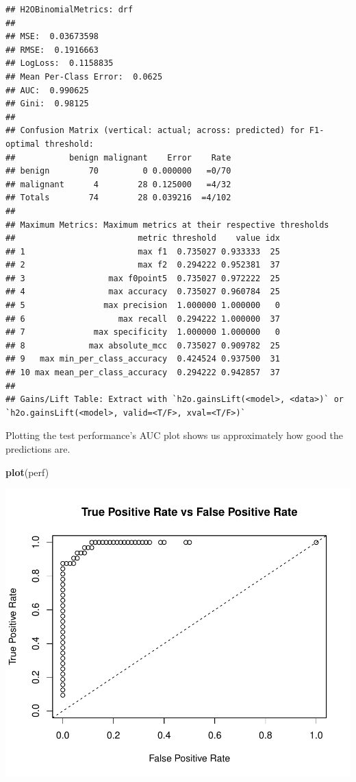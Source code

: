 \documentclass[]{article}
\newenvironment{Shaded}{\begin{snugshade}}{\end{snugshade}}
\newcommand{\KeywordTok}[1]{\textcolor[rgb]{0.13,0.29,0.53}{\textbf{{#1}}}}
\newcommand{\NormalTok}[1]{{#1}}
\begin{document}
\begin{verbatim}
## H2OBinomialMetrics: drf
## 
## MSE:  0.03673598
## RMSE:  0.1916663
## LogLoss:  0.1158835
## Mean Per-Class Error:  0.0625
## AUC:  0.990625
## Gini:  0.98125
## 
## Confusion Matrix (vertical: actual; across: predicted) for F1-optimal threshold:
##           benign malignant    Error    Rate
## benign        70         0 0.000000   =0/70
## malignant      4        28 0.125000   =4/32
## Totals        74        28 0.039216  =4/102
## 
## Maximum Metrics: Maximum metrics at their respective thresholds
##                         metric threshold    value idx
## 1                       max f1  0.735027 0.933333  25
## 2                       max f2  0.294222 0.952381  37
## 3                 max f0point5  0.735027 0.972222  25
## 4                 max accuracy  0.735027 0.960784  25
## 5                max precision  1.000000 1.000000   0
## 6                   max recall  0.294222 1.000000  37
## 7              max specificity  1.000000 1.000000   0
## 8             max absolute_mcc  0.735027 0.909782  25
## 9   max min_per_class_accuracy  0.424524 0.937500  31
## 10 max mean_per_class_accuracy  0.294222 0.942857  37
## 
## Gains/Lift Table: Extract with `h2o.gainsLift(<model>, <data>)` or `h2o.gainsLift(<model>, valid=<T/F>, xval=<T/F>)`
\end{verbatim}

Plotting the test performance's AUC plot shows us approximately how good
the predictions are.

\begin{Shaded}
\begin{Highlighting}[]
\KeywordTok{plot}\NormalTok{(perf)}
\end{Highlighting}
\end{Shaded}

\begin{center}\includegraphics{webinar_code_files/figure-latex/unnamed-chunk-42-1} \end{center}
\end{document}

